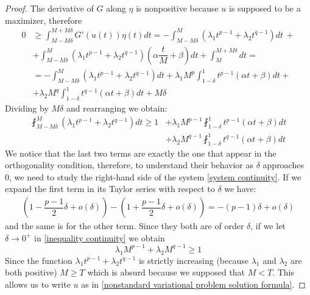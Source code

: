 \documentclass[corpo=11pt, stile=classica, tipotesi=custom,
greek, evenboxes, english]{toptesi}
\numberwithin{equation}{chapter}
\theoremstyle{remark}
\begin{document}
\begin{proof}
The derivative of $G$ along $\eta$ is nonpositive because $u$ is supposed to be a maximizer, therefore
\begin{align*}
	0 &\geq \int_{M-M\delta}^{M+M\delta} G'(u(t))\eta(t)dt = -\int_{M-M\delta}^M \left(\lambda_1 t^{p-1} + \lambda_2 t^{q-1}\right) dt\, +\\
	  &+ \int_{M-M\delta}^M \left(\lambda_1 t^{p-1} + \lambda_2 t^{q-1}\right)\left(\alpha \dfrac{t}{M}+\beta\right) dt + \int_M^{M+M\delta}dt = \\
	  &= -\int_{M-M\delta}^M \left(\lambda_1 t^{p-1} + \lambda_2 t^{q-1}\right) dt + \lambda_1 M^p \int_{1-\delta}^1 t^{p-1}(\alpha t + \beta) dt +\\
	  &+ \lambda_2 M^q \int_{1-\delta}^1 t^{q-1}(\alpha t + \beta) dt + M\delta
\end{align*}
Dividing by $M\delta$ and rearranging we obtain:
\begin{equation}\label{inequality continuity}
	\begin{aligned}
		\fint_{M-M\delta}^M \left(\lambda_1 t^{p-1} + \lambda_2 t^{q-1}\right) dt \geq  1 &+ \lambda_1 M^{p-1} \fint_{1-\delta}^1 t^{p-1}(\alpha t + \beta) dt\\ &+ \lambda_2 M^{q-1} \fint_{1-\delta}^1 t^{q-1}(\alpha t + \beta) dt
	\end{aligned}
\end{equation}
We notice that the last two terms are exactly the one that appear in the orthogonality condition, therefore, to understand their behavior as $\delta$ approaches 0, we need to study the right-hand side of the system \eqref{system continuity}. If we expand the first term in its Taylor series with respect to $\delta$ we have:
\begin{align*}
	\left(1-\dfrac{p-1}{2}\delta + o(\delta) \right) - \left(1+\dfrac{p-1}{2}\delta + o(\delta) \right) = -(p-1)\delta + o(\delta)
\end{align*}
and the same is for the other term. Since they both are of order $\delta$, if we let $\delta \rightarrow 0^+$ in \eqref{inequality continuity} we obtain
\begin{equation*}
	\lambda_1 M^{p-1} + \lambda_2 M^{q-1} \geq 1
\end{equation*}
Since the function $\lambda_1 t^{p-1}  + \lambda_2 t^{q-1}$ is strictly increasing (because $\lambda_1$ and $\lambda_2$ are both positive) $M \geq T$ which is absurd because we supposed that $M<T$. This allows us to write $u$ as in \eqref{nonstandard variational problem solution formula}.


\end{proof}
\end{document}
